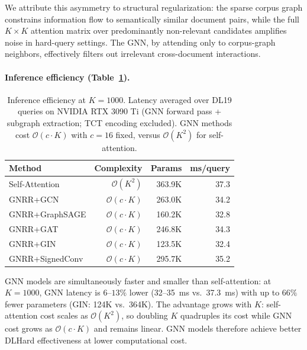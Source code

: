 \documentclass[runningheads]{llncs}
\begin{document}
We attribute this asymmetry to structural regularization: the sparse corpus graph constrains information flow to semantically similar document pairs, while the full $K\!\times\!K$ attention matrix over predominantly non-relevant candidates amplifies noise in hard-query settings. The GNN, by attending only to corpus-graph neighbors, effectively filters out irrelevant cross-document interactions.

\paragraph{Inference efficiency (Table~\ref{tab:efficiency}).}
\begin{table}[ht]
    \centering
    \footnotesize
    \caption{Inference efficiency at $K=1000$. Latency averaged over DL19 queries on NVIDIA RTX 3090 Ti (GNN forward pass + subgraph extraction; TCT encoding excluded). GNN methods cost $\mathcal{O}(c \cdot K)$ with $c=16$ fixed, versus $\mathcal{O}(K^2)$ for self-attention.}
    \vspace{0.1cm}
    \setlength{\tabcolsep}{4pt}
    \begin{tabular}{lrrr}
        \toprule
        \textbf{Method} & \textbf{Complexity} & \textbf{Params} & \textbf{ms/query} \\
        \midrule
        Self-Attention       & $\mathcal{O}(K^2)$         & 363.9K & 37.3 \\
        \midrule
        GNRR+GCN       & $\mathcal{O}(c \cdot K)$   & 263.0K & 34.2 \\
        GNRR+GraphSAGE & $\mathcal{O}(c \cdot K)$   & 160.2K & 32.8 \\
        GNRR+GAT       & $\mathcal{O}(c \cdot K)$   & 246.8K & 34.3 \\
        GNRR+GIN       & $\mathcal{O}(c \cdot K)$   & 123.5K & 32.4 \\
        GNRR+SignedConv & $\mathcal{O}(c \cdot K)$  & 295.7K & 35.2 \\
        \bottomrule
    \end{tabular}
    \label{tab:efficiency}
\end{table}

GNN models are simultaneously faster and smaller than self-attention: at $K=1000$, GNN latency is $6$--$13\%$ lower (32--35~ms vs.\ 37.3~ms) with up to $66\%$ fewer parameters (GIN: 124K vs.\ 364K). The advantage grows with $K$: self-attention cost scales as $\mathcal{O}(K^2)$, so doubling $K$ quadruples its cost while GNN cost grows as $\mathcal{O}(c \cdot K)$ and remains linear. GNN models therefore achieve better DLHard effectiveness at lower computational cost.
\end{document}

